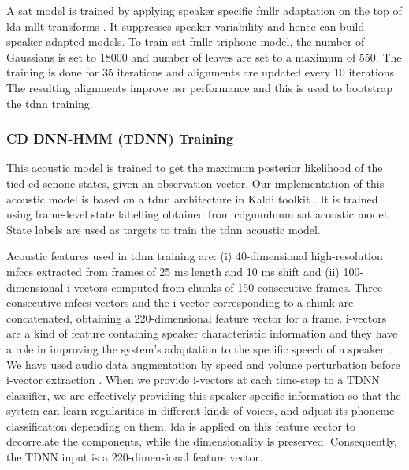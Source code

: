 A \gls{sat} model is trained by applying speaker specific \gls{fmllr}
adaptation on the top of \gls{lda}-\gls{mllt} transforms
\cite{gales1998maximum}. It suppresses speaker variability and hence can build
speaker adapted models. To train \gls{sat}-\gls{fmllr} triphone model, the
number of Gaussians is set to 18000 and number of leaves are set to a maximum
of 550. The training is done for 35 iterations and alignments are updated every
10 iterations. The resulting alignments improve \gls{asr} performance and this
is used to bootstrap the \gls{tdnn} training.

\subsubsection{CD DNN-HMM (TDNN) Training}

This acoustic model is  trained to get the maximum posterior likelihood of the tied \gls{cd} senone states, given an observation vector. Our implementation of this acoustic model is based on a \acrfull{tdnn}
\cite{peddinti2015time} architecture in Kaldi toolkit \cite{povey2011kaldi}. It is trained using frame-level state labelling
obtained from \gls{cdgmmhmm} \gls{sat} acoustic model. State labels are used as
targets to train the \gls{tdnn} acoustic model. 


Acoustic features used in \gls{tdnn} training are: (i) 40-dimensional
high-resolution \gls{mfcc}s extracted from frames of 25 ms length and 10 ms
shift and (ii) 100-dimensional i-vectors \cite{saon2013speaker} computed from
chunks of 150 consecutive frames. Three consecutive \gls{mfcc}s vectors and the
i-vector corresponding to a chunk are concatenated, obtaining a 220-dimensional
feature vector for a frame.  i-vectors are a kind of feature containing speaker characteristic information
and they have a role in improving the system’s adaptation to the specific
speech of a speaker \cite{georgescu2021performance}. We have used audio data
augmentation by speed and volume perturbation before i-vector extraction
\cite{ko2015audio}. When we provide i-vectors at each time-step to a TDNN
classifier, we are effectively providing this speaker-specific information so
that the system can learn regularities in different kinds of voices, and adjust
its phoneme classification depending on them. \gls{lda} is applied on this feature vector to decorrelate
the components, while the dimensionality is preserved. Consequently, the TDNN input is a 220-dimensional feature
vector.

